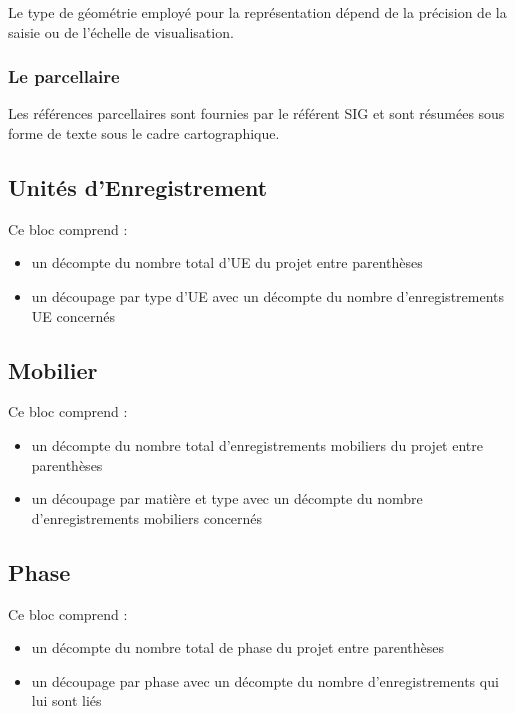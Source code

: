 \documentclass[letterpaper,10pt,french]{sphinxmanual}
\begin{document}
Le type de géométrie employé pour la représentation dépend de la précision de la saisie ou de l'échelle de visualisation.


\subsubsection{Le parcellaire}
\label{manuel/formulaire_projet:le-parcellaire}
Les références parcellaires sont fournies par le référent SIG et sont résumées sous forme de texte sous le cadre cartographique.


\subsection{Unités d'Enregistrement}
\label{manuel/formulaire_projet:unites-d-enregistrement}
Ce bloc comprend :
\begin{itemize}
\item {} 
un décompte du nombre total d'UE du projet entre parenthèses

\item {} 
un découpage par type d'UE avec un décompte du nombre d'enregistrements UE concernés

\end{itemize}


\subsection{Mobilier}
\label{manuel/formulaire_projet:mobilier}
Ce bloc comprend :
\begin{itemize}
\item {} 
un décompte du nombre total d'enregistrements mobiliers du projet entre parenthèses

\item {} 
un découpage par matière et type avec un décompte du nombre d'enregistrements mobiliers concernés

\end{itemize}


\subsection{Phase}
\label{manuel/formulaire_projet:phase}
Ce bloc comprend :
\begin{itemize}
\item {} 
un décompte du nombre total de phase du projet entre parenthèses

\item {} 
un découpage par phase avec un décompte du nombre d'enregistrements qui lui sont liés

\end{itemize}
\end{document}
